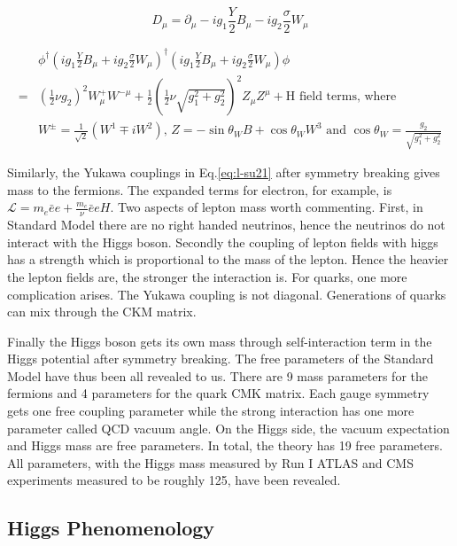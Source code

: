 \begin{equation}
 D_{\mu}  = \partial_{\mu}-ig_1\frac{Y}{2}B_{\mu} - ig_2\frac{\sigma}{2}W_{\mu}
  \label{eq:SU2U1D}
\end{equation}


\begin{equation}
  \begin{split}
   &\phi^{\dagger}(ig_1\frac{Y}{2}B_{\mu}+ig_2\frac{\sigma}{2}W_{\mu})^{\dagger} (ig_1\frac{Y}{2}B_{\mu}+ig_2\frac{\sigma}{2}W_{\mu}) \phi  \\
   =& (\frac{1}{2}\nu g_2)^2 W_{\mu}^+W^{-\mu} + \frac{1}{2}(\frac{1}{2}\nu \sqrt{g_1^2+g_2^2})^2 Z_{\mu}Z^{\mu} + \text{H field terms, where}\\
   &W^{\pm} = \frac{1}{\sqrt{2}}(W^1\mp iW^2) \text{, } Z = -\sin{\theta_W}B+\cos{\theta_W}W^3 \text{ and } \cos{\theta_W} = \frac{g_2}{\sqrt{g^2_1+g^2_2}}
  \end{split}
  \label{eq:SU2U1cov}
\end{equation}


Similarly, the Yukawa couplings in Eq.\ref{eq:l-su21} after symmetry breaking gives mass to the fermions. The expanded terms for electron, for example, is $\mathcal{L} = m_e\bar{e} e + \frac{m_{e}}{\nu}\bar{e}e H$. Two aspects of lepton mass worth commenting. First, in Standard Model there are no right handed neutrinos, hence the neutrinos do not interact with the Higgs boson. Secondly the coupling of lepton fields with higgs has a strength which is proportional to the mass of the lepton. Hence the heavier the lepton fields are, the stronger the interaction is. For quarks, one more complication arises. The Yukawa coupling is not diagonal. Generations of quarks can mix through the CKM matrix.

Finally the Higgs boson gets its own mass through self-interaction term in the Higgs potential after symmetry breaking. The free parameters of the Standard Model have thus been all revealed to us. There are 9 mass parameters for the fermions and 4 parameters for the quark CMK matrix. Each gauge symmetry gets one free coupling parameter while the strong interaction has one more parameter called QCD vacuum angle. On the Higgs side, the vacuum expectation and Higgs mass are free parameters. In total, the theory has 19 free parameters. All parameters, with the Higgs mass measured by Run I ATLAS and CMS experiments measured to be roughly 125\GeV, have been revealed. 


\subsection{Higgs Phenomenology}

